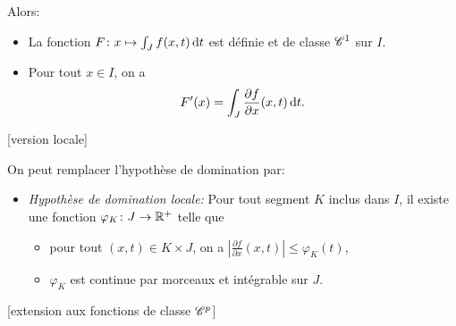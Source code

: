 \documentclass{yann}
\newcommand\DerPart[2]{\frac{\partial#1}{\partial#2}}
\begin{document}
Alors:
\begin{itemize}
\item
La fonction $F \colon x \mapsto \int_J f(x,t) \mathop{}\!\mathrm{d} t$ est définie et de classe $\mathscr{C}^{1}$ sur $I$.
\item
Pour tout $x\in I$, on a \[ F'(x) = \int_J \DerPart fx(x,t) \D t. \]
\end{itemize}

[version locale]

On peut remplacer l'hypothèse de domination par:
\begin{itemize}
\item
\emph{Hypothèse de domination locale:}
  Pour tout segment $K$ inclus dans $I$,
  il existe une fonction $\varphi_K \colon J \to \mathbb{R}^+$ telle que

  \begin{itemize}
  \item
pour tout $(x,t)\in K\times J$, on a $\left| \DerPart fx(x,t) \right| \leq \varphi_K(t)$,
  \item
$\varphi_K$ est continue par morceaux et intégrable sur $J$.
  \end{itemize}
\end{itemize}

[extension aux fonctions de classe $\mathscr{C}^{p}$]
\end{document}
